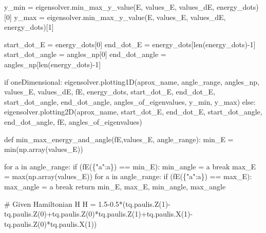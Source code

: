 \documentclass[
  letterpaper,
  DIV=11,
  numbers=noendperiod]{scrartcl}
\newenvironment{Shaded}{\begin{snugshade}}{\end{snugshade}}
\newcommand{\BuiltInTok}[1]{\textcolor[rgb]{0.00,0.23,0.31}{#1}}
\newcommand{\CommentTok}[1]{\textcolor[rgb]{0.37,0.37,0.37}{#1}}
\newcommand{\ControlFlowTok}[1]{\textcolor[rgb]{0.00,0.23,0.31}{#1}}
\newcommand{\DecValTok}[1]{\textcolor[rgb]{0.68,0.00,0.00}{#1}}
\newcommand{\FloatTok}[1]{\textcolor[rgb]{0.68,0.00,0.00}{#1}}
\newcommand{\KeywordTok}[1]{\textcolor[rgb]{0.00,0.23,0.31}{#1}}
\newcommand{\NormalTok}[1]{\textcolor[rgb]{0.00,0.23,0.31}{#1}}
\newcommand{\OperatorTok}[1]{\textcolor[rgb]{0.37,0.37,0.37}{#1}}
\newcommand{\StringTok}[1]{\textcolor[rgb]{0.13,0.47,0.30}{#1}}
\begin{document}
\begin{Shaded}
\begin{Highlighting}[]
\NormalTok{        y\_min }\OperatorTok{=}\NormalTok{ eigensolver.min\_max\_y\_value(E, values\_E, values\_dE, energy\_dots)[}\DecValTok{0}\NormalTok{]}
\NormalTok{        y\_max }\OperatorTok{=}\NormalTok{ eigensolver.min\_max\_y\_value(E, values\_E, values\_dE, energy\_dots)[}\DecValTok{1}\NormalTok{]}
        
\NormalTok{        start\_dot\_E }\OperatorTok{=}\NormalTok{ energy\_dots[}\DecValTok{0}\NormalTok{]}
\NormalTok{        end\_dot\_E }\OperatorTok{=}\NormalTok{ energy\_dots[}\BuiltInTok{len}\NormalTok{(energy\_dots)}\OperatorTok{{-}}\DecValTok{1}\NormalTok{]}
\NormalTok{        start\_dot\_angle }\OperatorTok{=}\NormalTok{ angles\_np[}\DecValTok{0}\NormalTok{]}
\NormalTok{        end\_dot\_angle }\OperatorTok{=}\NormalTok{ angles\_np[}\BuiltInTok{len}\NormalTok{(energy\_dots)}\OperatorTok{{-}}\DecValTok{1}\NormalTok{]}
        
        \ControlFlowTok{if}\NormalTok{ oneDimensional:}
\NormalTok{            eigensolver.plotting1D(aprox\_name, angle\_range, angles\_np, values\_E, values\_dE, fE, energy\_dots, start\_dot\_E, end\_dot\_E, start\_dot\_angle, end\_dot\_angle, angles\_of\_eigenvalues, y\_min, y\_max)}
        \ControlFlowTok{else}\NormalTok{:}
\NormalTok{            eigensolver.plotting2D(aprox\_name, start\_dot\_E, end\_dot\_E, start\_dot\_angle, end\_dot\_angle, fE, angles\_of\_eigenvalues)}
    

    \KeywordTok{def}\NormalTok{ min\_max\_energy\_and\_angle(fE,values\_E, angle\_range):}
\NormalTok{        min\_E }\OperatorTok{=} \BuiltInTok{min}\NormalTok{(np.array(values\_E))}

        \ControlFlowTok{for}\NormalTok{ a }\KeywordTok{in}\NormalTok{ angle\_range:}
            \ControlFlowTok{if}\NormalTok{ (fE(\{}\StringTok{"a"}\NormalTok{:a\}) }\OperatorTok{==}\NormalTok{ min\_E):}
\NormalTok{                min\_angle }\OperatorTok{=}\NormalTok{ a}
                \ControlFlowTok{break}
\NormalTok{        max\_E }\OperatorTok{=} \BuiltInTok{max}\NormalTok{(np.array(values\_E))}
        \ControlFlowTok{for}\NormalTok{ a }\KeywordTok{in}\NormalTok{ angle\_range:}
            \ControlFlowTok{if}\NormalTok{ (fE(\{}\StringTok{"a"}\NormalTok{:a\}) }\OperatorTok{==}\NormalTok{ max\_E):}
\NormalTok{                max\_angle }\OperatorTok{=}\NormalTok{ a}
                \ControlFlowTok{break}
        \ControlFlowTok{return}\NormalTok{ min\_E, max\_E, min\_angle, max\_angle}
    
\CommentTok{\# Given Hamiltonian H}
\NormalTok{H }\OperatorTok{=} \FloatTok{1.5}\OperatorTok{{-}}\FloatTok{0.5}\OperatorTok{*}\NormalTok{(tq.paulis.Z(}\DecValTok{1}\NormalTok{)}\OperatorTok{{-}}\NormalTok{tq.paulis.Z(}\DecValTok{0}\NormalTok{)}\OperatorTok{+}\NormalTok{tq.paulis.Z(}\DecValTok{0}\NormalTok{)}\OperatorTok{*}\NormalTok{tq.paulis.Z(}\DecValTok{1}\NormalTok{)}\OperatorTok{+}\NormalTok{tq.paulis.X(}\DecValTok{1}\NormalTok{)}\OperatorTok{{-}}\NormalTok{tq.paulis.Z(}\DecValTok{0}\NormalTok{)}\OperatorTok{*}\NormalTok{tq.paulis.X(}\DecValTok{1}\NormalTok{))}


\end{Highlighting}
\end{Shaded}
\end{document}
